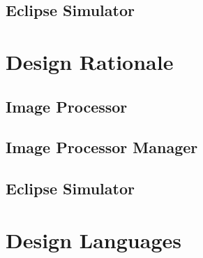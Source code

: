 \documentclass[10pt, onecolumn, draftclsnofoot, letterpaper, compsoc]{IEEEtran}
\begin{document}
\subsection{Eclipse Simulator}


\section{Design Rationale}

\subsection{Image Processor}

\subsection{Image Processor Manager}

\subsection{Eclipse Simulator}

\section{Design Languages}


\newpage



\end{document}
